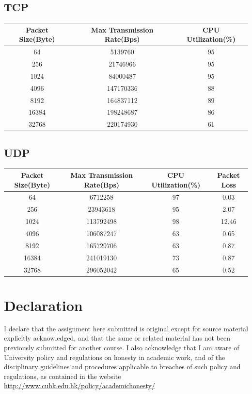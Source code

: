 \documentclass[11pt]{article}
\begin{document}
\subsection{TCP}
\begin{center}
\begin{tabular}{ccc}
Packet Size(Byte) & Max Transmission Rate(Bps) & CPU Utilization(\%) \\ [0.5ex]
\hline\hline
64	& 5139760  & 95 \\
256 & 21746966 & 95 \\
1024 & 84000487 & 95 \\
4096 & 147170336 & 88 \\
8192 & 164837112 & 89 \\
16384 & 198248687 & 86 \\ 
32768 & 220174930 & 61 \\
\hline
\end{tabular}
\end{center}


\subsection{UDP}
\begin{center}
\begin{tabular}{cccc}
Packet Size(Byte) & Max Transmission Rate(Bps) & CPU Utilization(\%) & Packet Loss\\ [0.5ex]
\hline\hline
64	& 6712258 & 97 & 0.03 \\
256 & 23943618 & 95 & 2.07 \\
1024 & 113792498 & 98 & 12.46 \\
4096 & 106087247 & 63 & 0.65 \\
8192 & 165729706 & 63 & 0.87 \\
16384 & 241019130 & 73 & 0.87 \\
32768 & 296052042 & 65 & 0.52 \\
\hline
\end{tabular}
\end{center}
\section{Declaration}
I declare that the assignment here submitted is original except for source material explicitly acknowledged, and that the same or related material has not been previously submitted for another course. I also acknowledge that I am aware of University policy and regulations on honesty in academic work, and of the disciplinary guidelines and procedures applicable to breaches of such policy and regulations, as contained in the website \url{http://www.cuhk.edu.hk/policy/academichonesty/}
\end{document}
